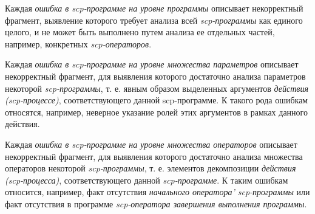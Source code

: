 Каждая \textit{ошибка в scp-программе на уровне программы} описывает некорректный фрагмент, выявление которого требует анализа всей \textit{scp-программы} как единого целого, и не может быть выполнено путем анализа ее отдельных частей, например, конкретных \textit{scp-операторов}.

\begin{SCn}
\begin{scnindent}
\end{scnindent}
\begin{scnindent}
\end{scnindent}
\end{SCn}

Каждая \textit{ошибка в scp-программе на уровне множества параметров} описывает некорректный фрагмент, для выявления которого достаточно анализа параметров некоторой \textit{scp-программы}, т. е. явным образом выделенных аргументов \textit{действия (scp-процессе)}, соответствующего данной scp-программе. К такого рода ошибкам относятся, например, неверное указание ролей этих аргументов в рамках данного действия.

\begin{SCn}
\begin{scnindent}
\end{scnindent}
\begin{scnindent}
\end{scnindent}
\end{SCn}

Каждая \textit{ошибка в scp-программе на уровне множества операторов} описывает некорректный фрагмент, для выявления которого достаточно анализа множества операторов некоторой \textit{scp-программы}, т. е. элементов декомпозиции \textit{действия (scp-процесса)}, соответствующего данной \textit{scp-программе}. К таким ошибкам относится, например, факт отсутствия \textit{начального оператора' scp-программы} или факт отсутствия в программе \textit{scp-оператора завершения выполнения программы}.

